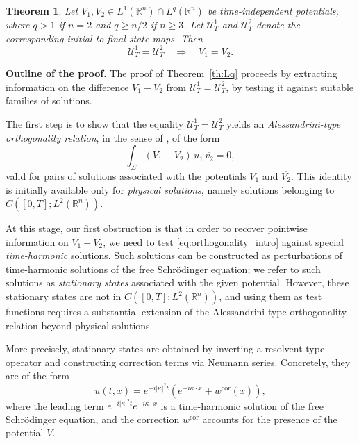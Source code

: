 \documentclass[11pt,a4paper]{amsart}
\newtheorem{theorem}[proposition]{Theorem}
\theoremstyle{remark}
\theoremstyle{definition}
\newcommand{\R}{\mathbb{R}}
\def\ovl{\overline}
\begin{document}
\begin{theorem}\sl \label{th:Lq} Let $V_1,V_2\in L^1(\R^n)\cap L^q(\R^n)$ be time-independent potentials, where $q>1$ if $n=2$ and $q\ge n/2$ if $n\ge 3$. Let $\mathcal U_T^1$ and $\mathcal U_T^2$ denote the corresponding initial-to-final-state maps. Then
\[
\mathcal U_T^1=\mathcal U_T^2 \quad\Longrightarrow\quad V_1=V_2.
\]
\end{theorem}

\medskip
\noindent\textbf{Outline of the proof.}
The proof of Theorem~\ref{th:Lq} proceeds by extracting information on the difference $V_1-V_2$ from $\mathcal U_T^1 = \mathcal U_T^2$, by testing it against suitable families of solutions.

The first step is to show that the equality $\mathcal U_T^1=\mathcal U_T^2$ yields an \emph{Alessandrini-type orthogonality relation}, in the sense of \cite{Aless}, of the form
\begin{equation}\label{eq:orthogonality_intro}
\int_{\Sigma} (V_1-V_2)\,u_1\,\overline{v_2}=0,
\end{equation}
valid for pairs of solutions associated with the potentials $V_1$ and $\ovl{V_2}$. This identity is initially available only for \emph{physical solutions}, namely solutions belonging to $C([0,T];L^2(\R^n))$. 

At this stage, our first obstruction is that in order to recover pointwise information on $V_1-V_2$, we need to test \eqref{eq:orthogonality_intro} against special \emph{time-harmonic} solutions. Such solutions can be constructed as perturbations of time-harmonic solutions of the  free Schr\"odinger equation; we refer to such solutions as \emph{stationary states} associated with the given potential. However, these stationary states are not in $C([0, T]; L^2(\R^n))$, and using them as test functions requires a substantial extension of the Alessandrini-type orthogonality relation beyond physical solutions.

More precisely, stationary states are obtained by inverting a resolvent-type operator and constructing correction terms via Neumann series. Concretely, they are of the form
\[
u(t,x)=e^{-i|\kappa|^2 t}\left(e^{-i\kappa\cdot x}+w^{\mathrm{cor}}(x)\right),
\]
where the leading term \(e^{-i|\kappa|^2 t}e^{-i\kappa\cdot x}\) is a time-harmonic solution of the free Schr\"odinger equation, and the correction \(w^{\mathrm{cor}}\) accounts for the presence of the potential \(V\).
\end{document}
